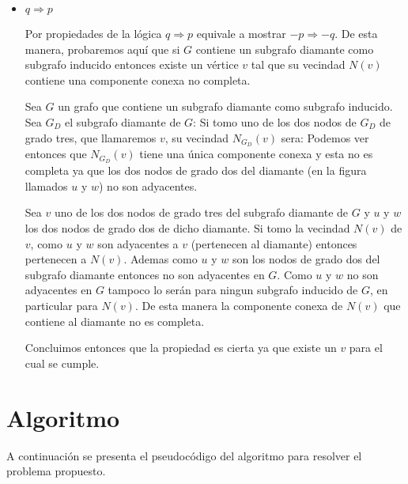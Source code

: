 \documentclass[a4paper,11pt] {article}
\begin{document}
\begin{itemize}
\item $q \Longrightarrow p$

Por propiedades de la l\'ogica $q \Longrightarrow p$ equivale a mostrar $-p \Longrightarrow -q$. De esta manera, probaremos aqu\'i que si $G$ contiene un subgrafo diamante como subgrafo inducido entonces existe un v\'ertice $v$ tal que su vecindad $N(v)$ contiene una componente conexa no completa.

Sea $G$ un grafo que contiene un subgrafo diamante como subgrafo inducido. Sea $G_{D}$ el subgrafo diamante de $G$:
Si tomo uno de los dos nodos de $G_{D}$ de grado tres, que llamaremos $v$, su vecindad $N_{G_{D}}(v)$ sera:
Podemos ver entonces que $N_{G_{D}}(v)$ tiene una \'unica componente conexa y esta no es completa ya que los dos nodos de grado dos del diamante (en la figura llamados $u$ y $w$) no son adyacentes.

Sea $v$ uno de los dos nodos de grado tres del subgrafo diamante de $G$ y $u$ y $w$ los dos nodos de grado dos de dicho diamante. Si tomo la vecindad $N(v)$ de $v$, como $u$ y $w$ son adyacentes a $v$ (pertenecen al diamante) entonces pertenecen a $N(v)$. Ademas como $u$ y $w$ son los nodos de grado dos del subgrafo diamante entonces no son adyacentes en $G$. Como $u$ y $w$ no son adyacentes en $G$ tampoco lo ser\'an para ningun subgrafo inducido de $G$, en particular para $N(v)$. De esta manera la componente conexa de $N(v)$ que contiene al diamante no es completa.

Concluimos entonces que la propiedad es cierta ya que existe un $v$ para el cual se cumple.

\end{itemize}

\section*{Algoritmo}

A continuaci\'on se presenta el pseudoc\'odigo del algoritmo para resolver el problema propuesto.
\end{document}
